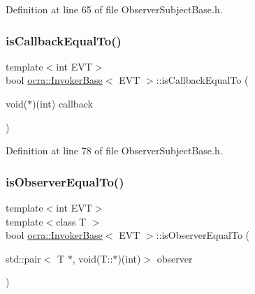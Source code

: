 Definition at line 65 of file Observer\+Subject\+Base.\+h.

\hypertarget{classocra_1_1InvokerBase_a89f5d1ce29dcec8811e41e1e5992350d}{}\label{classocra_1_1InvokerBase_a89f5d1ce29dcec8811e41e1e5992350d} 
\subsubsection{\texorpdfstring{is\+Callback\+Equal\+To()}{isCallbackEqualTo()}\hspace{0.1cm}{\footnotesize\ttfamily [2/2]}}
{\footnotesize\ttfamily template$<$int E\+VT$>$ \\
bool \hyperlink{classocra_1_1InvokerBase}{ocra\+::\+Invoker\+Base}$<$ E\+VT $>$\+::is\+Callback\+Equal\+To (\begin{DoxyParamCaption}\item[{void($\ast$)(int)}]{callback }\end{DoxyParamCaption})\hspace{0.3cm}{\ttfamily [inline]}}



Definition at line 78 of file Observer\+Subject\+Base.\+h.

\hypertarget{classocra_1_1InvokerBase_a1ba940e9b5c9559fd7904dda940d2501}{}\label{classocra_1_1InvokerBase_a1ba940e9b5c9559fd7904dda940d2501} 
\subsubsection{\texorpdfstring{is\+Observer\+Equal\+To()}{isObserverEqualTo()}}
{\footnotesize\ttfamily template$<$int E\+VT$>$ \\
template$<$class T $>$ \\
bool \hyperlink{classocra_1_1InvokerBase}{ocra\+::\+Invoker\+Base}$<$ E\+VT $>$\+::is\+Observer\+Equal\+To (\begin{DoxyParamCaption}\item[{std\+::pair$<$ T $\ast$, void(T\+::$\ast$)(int)$>$}]{observer }\end{DoxyParamCaption})\hspace{0.3cm}{\ttfamily [inline]}}



